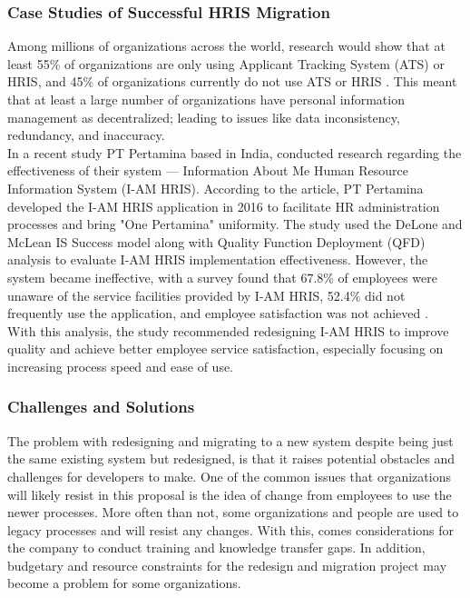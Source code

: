         \subsubsection{Case Studies of Successful HRIS Migration}
        Among millions of organizations across the world, research would show that at least 55\% of organizations are only using Applicant Tracking System (ATS) or HRIS, and 45\% of organizations currently do not use ATS or HRIS \cite{ms12019}. This meant that at least a large number of organizations have personal information management as decentralized; leading to issues like data inconsistency, redundancy, and inaccuracy.
        \\

        In a recent study PT Pertamina based in India, conducted research regarding the effectiveness of their system --- Information About Me Human Resource Information System (I-AM HRIS). According to the article, PT Pertamina developed the I-AM HRIS application in 2016 to facilitate HR administration processes and bring "One Pertamina" uniformity. The study used the DeLone and McLean IS Success model along with Quality Function Deployment (QFD) analysis to evaluate I-AM HRIS implementation effectiveness. However, the system became ineffective, with a survey found that 67.8\% of employees were unaware of the service facilities provided by I-AM HRIS, 52.4\% did not frequently use the application, and employee satisfaction was not achieved \cite{rh12021}. 
        \\

        With this analysis, the study recommended redesigning I-AM HRIS to improve quality and achieve better employee service satisfaction, especially focusing on increasing process speed and ease of use.
        
        \subsubsection{Challenges and Solutions}
        The problem with redesigning and migrating to a new system despite being just the same existing system but redesigned, is that it raises potential obstacles and challenges for developers to make. One of the common issues that organizations will likely resist in this proposal is the idea of change from employees to use the newer processes. More often than not, some organizations and people are used to legacy processes and will resist any changes. With this, comes considerations for the company to conduct training and knowledge transfer gaps. In addition, budgetary and resource constraints for the redesign and migration project may become a problem for some organizations.
        \\

